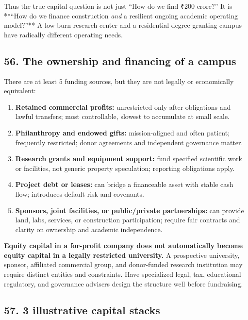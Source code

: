 Thus the true capital question is not just ``How do we find \textnormal{₹}200 crore?'' It is **``How do we finance construction \textit{and} a resilient ongoing academic operating model?''** A low-burn research center and a residential degree-granting campus have radically different operating needs.

\subsection{56. The ownership and financing of a campus}

There are at least 5 funding sources, but they are not legally or economically equivalent:

\begin{enumerate}[leftmargin=*,itemsep=1.5pt]
  \item \textbf{Retained commercial profits:} unrestricted only after obligations and lawful transfers; most controllable, slowest to accumulate at small scale.
  \item \textbf{Philanthropy and endowed gifts:} mission-aligned and often patient; frequently restricted; donor agreements and independent governance matter.
  \item \textbf{Research grants and equipment support:} fund specified scientific work or facilities, not generic property speculation; reporting obligations apply.
  \item \textbf{Project debt or leases:} can bridge a financeable asset with stable cash flow; introduces default risk and covenants.
  \item \textbf{Sponsors, joint facilities, or public/\allowbreak private partnerships:} can provide land, labs, services, or construction participation; require fair contracts and clarity on ownership and academic independence.
\end{enumerate}

\textbf{Equity capital in a for-profit company does not automatically become equity capital in a legally restricted university.} A prospective university, sponsor, affiliated commercial group, and donor-funded research institution may require distinct entities and constraints. Have specialized legal, tax, educational regulatory, and governance advisers design the structure well before fundraising.

\subsection{57. 3 illustrative capital stacks}

